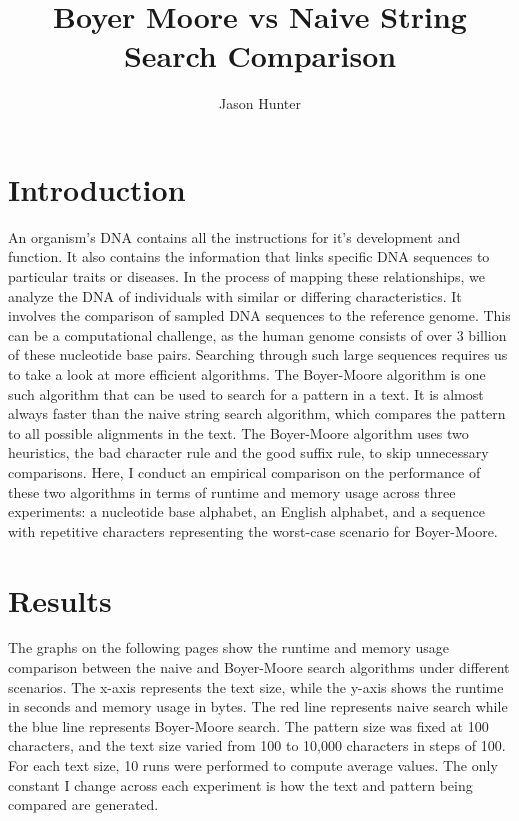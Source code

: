 \documentclass[11pt, letterpaper]{article}
\begin{document}
\title{Boyer Moore vs Naive String Search Comparison}
\author{Jason Hunter}
\maketitle

\section{Introduction}
An organism's DNA contains all the instructions for it's development and function.
It also contains the information that links specific DNA sequences to particular traits or diseases.
In the process of mapping these relationships,
we analyze the DNA of individuals with similar or differing characteristics.
It involves the comparison of sampled DNA sequences to the reference genome.
This can be a computational challenge, as the human genome consists of over 3 billion of these nucleotide base pairs.
Searching through such large sequences requires us to take a look at more efficient algorithms.
The Boyer-Moore algorithm is one such algorithm that can be used to search for a pattern in a text.
It is almost always faster than the naive string search algorithm, which compares the pattern to all possible alignments in the text.
The Boyer-Moore algorithm uses two heuristics, the bad character rule and the good suffix rule, to skip unnecessary comparisons.
Here, I conduct an empirical comparison on the performance of these two algorithms in terms of runtime and memory usage across three experiments: 
a nucleotide base alphabet, an English alphabet, 
and a sequence with repetitive characters representing the worst-case scenario for Boyer-Moore.

\section{Results}
The graphs on the following pages show the runtime and memory usage comparison between the naive and Boyer-Moore search algorithms under different scenarios. 
The x-axis represents the text size, while the y-axis shows the runtime in seconds and memory usage in bytes. The red line represents naive search while the blue line represents Boyer-Moore search.
The pattern size was fixed at 100 characters, and the text size varied from 100 to 10,000 characters in steps of 100.
For each text size, 10 runs were performed to compute average values. The only constant I change
across each experiment is how the text and pattern being compared are generated.
\end{document}
